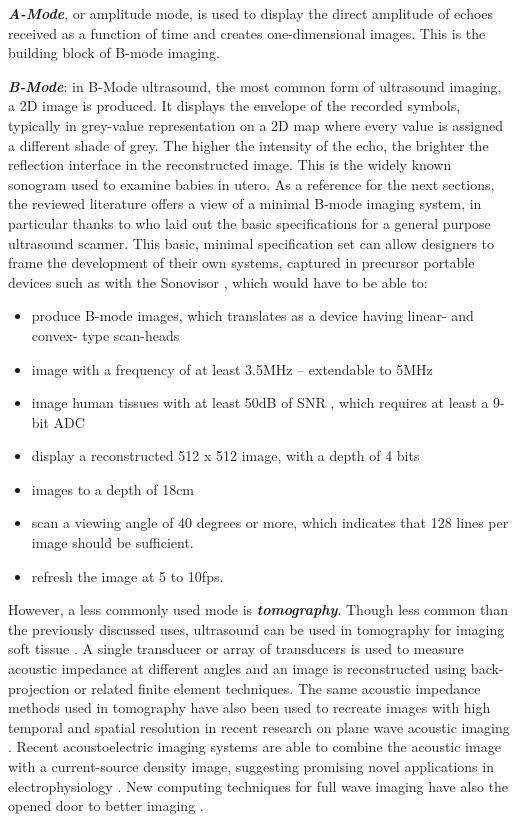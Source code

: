 \documentclass{article}
\begin{document}
\textbf{\textit{A-Mode}}, or amplitude mode, is used to display the direct amplitude of echoes received as a function of time and creates one-dimensional images. This is the building block of B-mode imaging.

\textbf{\textit{B-Mode}}: in B-Mode ultrasound, the most common form of ultrasound imaging, a 2D image is produced. It displays the envelope of the recorded symbols, typically in grey-value representation on a 2D map where every value is assigned a different shade of grey. The higher the intensity of the echo, the brighter the reflection interface in the reconstructed image. This is the widely known sonogram used to examine babies in utero. As a reference for the next sections, the reviewed literature offers a view of a minimal B-mode imaging system, in particular thanks to \cite{kurjak_use_1986} who laid out the basic specifications for a general purpose ultrasound scanner. This basic, minimal specification set can allow designers to frame the development of their own systems, captured in precursor portable devices such as with the Sonovisor \cite{zeiss_sonovisor_1962}, which would have to be able to:

\begin{itemize}
\item produce B-mode images, which translates as a device having linear- and convex- type scan-heads
\item image with a frequency of at least 3.5MHz -- extendable to 5MHz
\item image human tissues with at least 50dB of SNR \cite{attarzadeh_low-power_2017}, which requires at least a 9-bit ADC 
\item display a reconstructed 512 x 512 image, with a depth of 4 bits
\item images to a depth of 18cm
\item scan a viewing angle of 40 degrees or more, which indicates that 128 lines per image should be sufficient.
\item refresh the image at 5 to 10fps.
\end{itemize}



However, a less commonly used mode is \textbf{\textit{tomography}}. Though less common than the previously discussed uses, ultrasound can be used in tomography for imaging soft tissue \cite{zhang_design_2015, duric_detection_2007, wen_design_2019, ashfaq_new_2004}. A single transducer or array of transducers is used to measure acoustic impedance at different angles and an image is reconstructed using back-projection or related finite element techniques. The same acoustic impedance methods used in tomography have also been used to recreate images with high temporal and spatial resolution in recent research on plane wave acoustic imaging \cite{Rabut2019,Warner2013}. Recent acoustoelectric imaging systems are able to combine the acoustic image with a current-source density image, suggesting promising novel applications in electrophysiology \cite{Xi2009, Qin2017}. New computing techniques for full wave imaging have also the opened door to better imaging \cite{guasch_full-waveform_2020, rymarczyk_logistic_2019}. 
\end{document}

